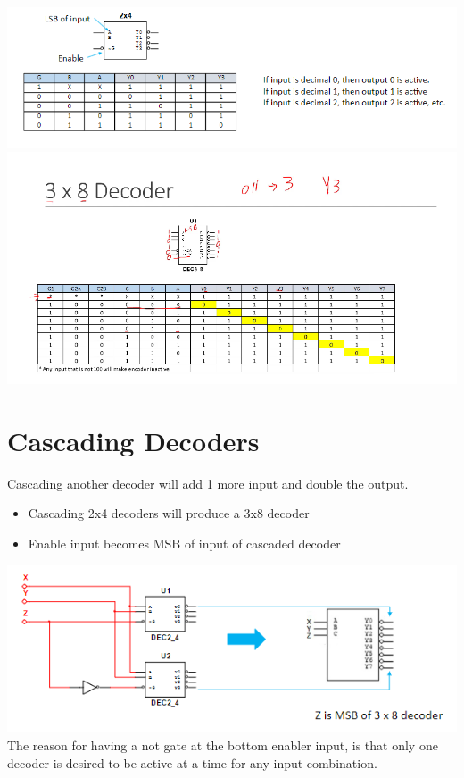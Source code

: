 \documentclass[a4paper,12pt]{article}
\begin{document}
          \includegraphics[width=20cm]{Two4Decoder.png}
          \includegraphics[width=20cm]{3x8decoder.png}
          \hrulefill

          \section{Cascading Decoders}
            Cascading another decoder will add 1 more input and double the output.
            \begin{itemize}
                \item Cascading 2x4 decoders will produce a 3x8 decoder
                \item Enable input becomes MSB of input of cascaded decoder
            \end{itemize}
            \includegraphics[width=15cm]{CascadingDecoder.png}\\
            The reason for having a not gate at the bottom enabler input, is that only one decoder is desired to be active at a time for any input combination. \vspace*{10pt}
\end{document}
